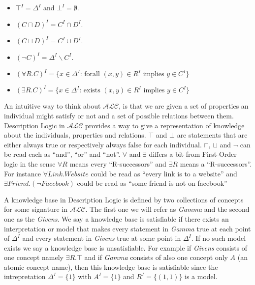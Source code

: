 \begin{itemize}
\item $\top^{I} = \Delta^{I}$ and $\bot^{I} = \emptyset$.
\item $(C \sqcap D)^{I} = C^{I} \cap D^{I}$.
\item $(C \sqcup D)^{I} = C^{I} \cup D^{I}$.
\item $(\neg C)^{I} = \Delta^{I} \backslash C^{I}$.
\item $(\forall R . C)^{I} = \{x \in \Delta^{I} \text{: forall } (x,y) \in R^{I} \text{ implies } y \in C^{I}\}$ 
\item $(\exists R . C)^{I} = \{x \in \Delta^{I} \text{: exists } (x,y) \in R^{I} \text{ implies } y \in C^{I}\}$ 
\end{itemize}

An intuitive way to think about $\mathcal{ALC}$, is that we are given
a set of properties an individual might satisfy or not and a set of
possible relations between them. Description Logic in $\mathcal{ALC}$
provides a way to give a representation of knowledge about the
individuals, properties and relations.  $\top$ and $\bot$ are
statements that are either always true or respectively always false
for each individual.  $\sqcap$, $\sqcup$ and $\neg$ can be read each
as ``and'', ``or'' and ``not''. $\forall$ and $\exists$ differs a bit
from First-Order logic in the sense $\forall R$ means every
``R-successors'' and $\exists R$ means a ``R-successors''. For
instance $\forall Link . Website$ could be read as ``every link is to
a website'' and $\exists Friend . (\neg Facebook)$ could be read as
``some friend is not on facebook''

A knowledge base in Description Logic is defined by two collections of
concepts for some signature in $\mathcal{ALC}$. The first one we will
refer as \textit{Gamma} and the second one as the \textit{Givens}. We
say a knowledge base is satisfiable if there exists an interpretation
or model that makes every statement in \textit{Gamma} true at each
point of $\Delta^{I}$ and every statement in \textit{Givens} true at
some point in $\Delta^{I}$. If no such model exists we say a knowledge
base is unsatisfiable. For example if \textit{Givens} consists of one
concept namely $\exists R. \top$ and if \textit{Gamma} consists of
also one concept only $A$ (an atomic concept name), then this
knowledge base is satisfiable since the intrepretation $\Delta^{I}
= \{1\}$ with $A^{I} = \{1\}$ and $R^{I} = \{(1,1)\}$ is a model.
